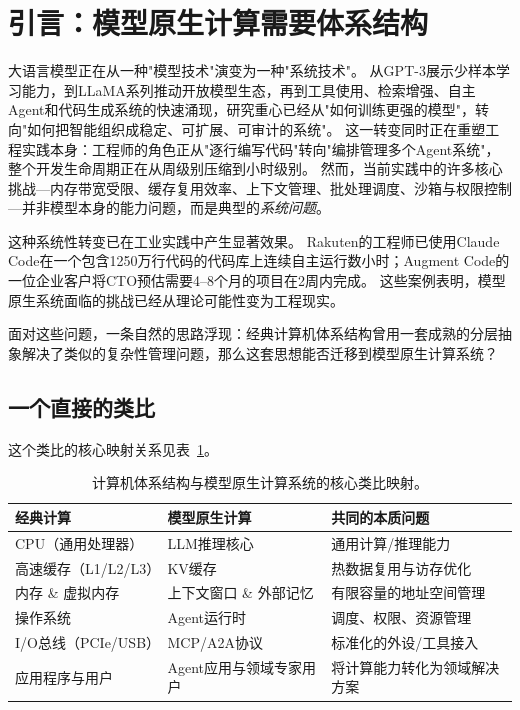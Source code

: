 \section{引言：模型原生计算需要体系结构}
\label{sec:intro}

大语言模型正在从一种"模型技术"演变为一种"系统技术"。
从GPT-3展示少样本学习能力\cite{brown2020gpt3}，到LLaMA系列推动开放模型生态\cite{llama2023}，再到工具使用\cite{schick2023toolformer}、检索增强\cite{lewis2020rag}、自主Agent\cite{yao2023react}和代码生成系统\cite{openhands_paper_2025,sweagent2024}的快速涌现，研究重心已经从"如何训练更强的模型"，转向"如何把智能组织成稳定、可扩展、可审计的系统"。
这一转变同时正在重塑工程实践本身：工程师的角色正从"逐行编写代码"转向"编排管理多个Agent系统"，整个开发生命周期正在从周级别压缩到小时级别\cite{anthropic2026agenticreport}。
然而，当前实践中的许多核心挑战---内存带宽受限\cite{gholami2024memorywall}、缓存复用效率\cite{kwon2023pagedattention}、上下文管理\cite{memgpt2023}、批处理调度\cite{orca2022}、沙箱与权限控制\cite{ironclaw2025}---并非模型本身的能力问题，而是典型的\emph{系统问题}。

这种系统性转变已在工业实践中产生显著效果。
Rakuten的工程师已使用Claude Code在一个包含1250万行代码的代码库上连续自主运行数小时\cite{anthropic2026agenticreport}；Augment Code的一位企业客户将CTO预估需要4--8个月的项目在2周内完成\cite{anthropic2026agenticreport}。
这些案例表明，模型原生系统面临的挑战已经从理论可能性变为工程现实。

面对这些问题，一条自然的思路浮现：经典计算机体系结构曾用一套成熟的分层抽象解决了类似的复杂性管理问题，那么这套思想能否迁移到模型原生计算系统？

\subsection{一个直接的类比}

这个类比的核心映射关系见表~\ref{tab:analogy-mapping}。

\begin{table}[t]
\centering
\footnotesize
\caption{计算机体系结构与模型原生计算系统的核心类比映射。}
\label{tab:analogy-mapping}
\begin{tabularx}{\textwidth}{>{\raggedright\arraybackslash}p{}>{\raggedright\arraybackslash}p{}>{\raggedright\arraybackslash}p{}}
\toprule
\textbf{经典计算} & \textbf{模型原生计算} & \textbf{共同的本质问题} \\
\midrule
CPU（通用处理器） & LLM推理核心 & 通用计算/推理能力 \\
高速缓存（L1/L2/L3） & KV缓存 & 热数据复用与访存优化 \\
内存 \& 虚拟内存 & 上下文窗口 \& 外部记忆 & 有限容量的地址空间管理 \\
操作系统 & Agent运行时 & 调度、权限、资源管理 \\
I/O总线（PCIe/USB） & MCP/A2A协议 & 标准化的外设/工具接入 \\
应用程序与用户 & Agent应用与领域专家用户 & 将计算能力转化为领域解决方案 \\
\bottomrule
\end{tabularx}
\end{table}


